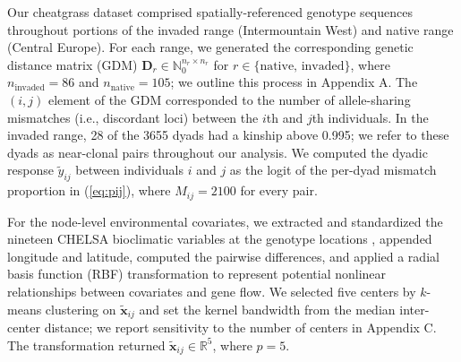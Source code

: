 \documentclass{article}
\begin{document}
Our cheatgrass dataset comprised spatially-referenced genotype sequences throughout portions of the invaded range (Intermountain West) and native range (Central Europe). For each range, we generated the corresponding genetic distance matrix (GDM) $\mathbf{D}_{r}\in\mathbb{N}_0^{n_r\times n_r}$ for $r\in\{\text{native, invaded}\}$, where $n_\text{invaded}=86$ and $n_\text{native}=105$; we outline this process in Appendix A. The $(i,j)$ element of the GDM corresponded to the number of allele-sharing mismatches (i.e., discordant loci) between the $i$th and $j$th individuals. In the invaded range, 28 of the 3655 dyads had a kinship above 0.995; we refer to these dyads as near-clonal pairs throughout our analysis. We computed the dyadic response $\widetilde{y}_{ij}$ between individuals $i$ and $j$ as the logit of the per-dyad mismatch proportion in (\ref{eq:pij}), where $M_{ij}=2100$ for every pair.

For the node-level environmental covariates, we extracted and standardized the nineteen CHELSA bioclimatic variables at the genotype locations \citep{karger2017climatologies}, appended longitude and latitude, computed the pairwise differences, and applied a radial basis function (RBF) transformation to represent potential nonlinear relationships between covariates and gene flow. We selected five centers by $k$-means clustering on $\widetilde{\mathbf{x}}_{ij}$ and set the kernel bandwidth from the median inter-center distance; we report sensitivity to the number of centers in Appendix C. The transformation returned $\widetilde{\mathbf{x}}_{ij}\in\mathbb{R}^5$, where $p=5$.

\end{document}
